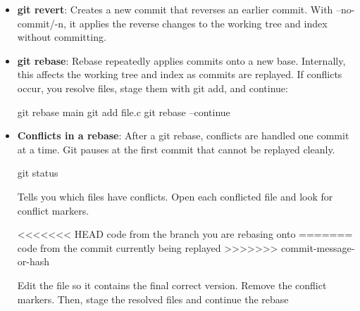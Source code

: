 \documentclass{report}
\begin{document}
\begin{itemize}
\begin{itemize}
                    \bigbreak \noindent 
                    \begin{bashcode}
                        git cherry-pick abc123
                    \end{bashcode}
                    \bigbreak \noindent 
                    After resolving conflicts:
                    \bigbreak \noindent 
                    \begin{bashcode}
                        git add file.c
                        git cherry-pick --continue
                    \end{bashcode}
                \item \textbf{git revert}: Creates a new commit that reverses an earlier commit. With --no-commit/-n, it applies the reverse changes to the working tree and index without committing.
                \item \textbf{git rebase}: Rebase repeatedly applies commits onto a new base. Internally, this affects the working tree and index as commits are replayed. If conflicts occur, you resolve files, stage them with git add, and continue:
                    \bigbreak \noindent 
                    \begin{bashcode}
                        git rebase main
                        git add file.c
                        git rebase --continue
                    \end{bashcode}
                \item \textbf{Conflicts in a rebase}: After a git rebase, conflicts are handled one commit at a time. Git pauses at the first commit that cannot be replayed cleanly.
                    \bigbreak \noindent 
                    \begin{bashcode}
                        git status
                    \end{bashcode}
                    \bigbreak \noindent 
                    Tells you which files have conflicts. Open each conflicted file and look for conflict markers. 
                    \bigbreak \noindent 
                    \begin{bashcode}
                        <<<<<<< HEAD
                        code from the branch you are rebasing onto
                        =======
                        code from the commit currently being replayed
                        >>>>>>> commit-message-or-hash
                    \end{bashcode}
                    \bigbreak \noindent 
                    Edit the file so it contains the final correct version. Remove the conflict markers. Then, stage the resolved files and continue the rebase

\end{itemize}
\end{itemize}
\end{document}
